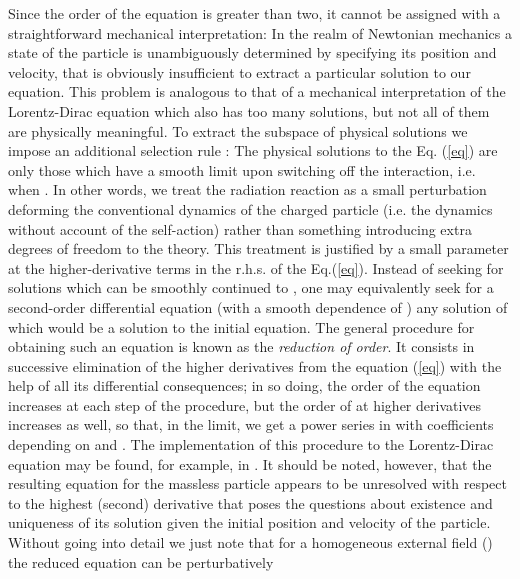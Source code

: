 \documentclass[a4paper,12pt]{article}
\begin{document}
Since the order of the equation is greater than two, it cannot be
assigned with a straightforward mechanical interpretation: In the
realm of Newtonian mechanics a state of the particle is
unambiguously determined by specifying  its position and
velocity, that is obviously insufficient to extract a particular
solution to our equation. This problem is analogous to that of a
mechanical interpretation of the Lorentz-Dirac equation which also
has too many solutions, but not all of them are physically
meaningful. To extract the subspace of physical solutions we
impose an additional selection rule \cite{Bh}: The physical
solutions to the Eq. (\ref{eq}) are only those which have a
smooth limit upon switching off the interaction, i.e. when \coordHE{}. In other words, we treat the radiation reaction
as a small perturbation deforming the conventional dynamics of
the charged particle (i.e. the dynamics without account of the
self-action) rather than something introducing extra degrees of
freedom to the theory. This treatment is justified by a small
parameter \coordHE{} at the higher-derivative terms in the r.h.s. of the
Eq.(\ref{eq}). Instead of seeking for solutions which can be
smoothly continued to \coordHE{}, one may equivalently seek for a
second-order differential equation (with a  smooth dependence of
\coordHE{}) any solution of which would be a solution to the initial
equation. The general procedure for obtaining such an equation is
known as the \textit{reduction of order}. It consists in
successive elimination of the higher derivatives from the
equation (\ref{eq}) with the help of all its differential
consequences; in so doing, the order of the equation increases at
each step of the procedure, but the order of \coordHE{} at higher
derivatives increases as well, so that, in the limit, we get a
power series in \coordHE{} with coefficients depending on \coordHE{} and
\coordHE{}. The implementation of this procedure to the Lorentz-Dirac
equation may be found, for example, in \cite{LL, Poisson, M}. It
should be noted, however, that the resulting equation for the
massless particle appears to be unresolved with respect to the
highest (second) derivative that poses the questions about
existence and uniqueness of its solution given the initial
position and velocity of the particle. Without going into detail
we just note that for a homogeneous external field
(\coordHE{}) the reduced equation can be perturbatively
\end{document}
